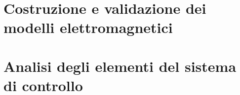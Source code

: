 \documentclass[%
    twoside,
    paper=a4,
    dottedtoc,
    manychapters,
]{tesiclassica}
\numberwithin{equation}{chapter}
\theoremstyle{definition}
\theoremstyle{remark}
\begin{document}
\pagestyle{plain}


\cleardoublepage
\cleardoublepage
\cleardoublepage 
\pagestyle{scrheadings}
\cleardoublepage


\cleardoublepage\part{Costruzione e validazione dei modelli elettromagnetici}




\cleardoublepage\part{Analisi degli elementi del sistema di controllo}






%

\end{document}
